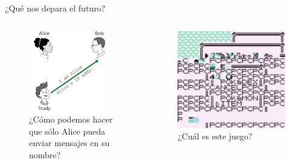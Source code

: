 \documentclass[10pt]{beamer} %
\begin{document}
\begin{frame}{¿Qué nos depara el futuro?}
\begin{columns}
\begin{column}{.5\linewidth}
    \begin{figure}[h]
	\includegraphics[width=\linewidth,]{trudy.png}
	\caption{¿Cómo podemos hacer que sólo Alice pueda enviar mensajes en su nombre?}
	\label{fig:RSA}
	\end{figure}
\end{column}
\begin{column}{.5\linewidth}
    \begin{figure}[h]
	\includegraphics[width=\linewidth,]{8F.png}
	\caption{¿Cuál es este juego?}
	\label{fig:ACE}
	\end{figure}
    
\end{column}
\end{columns}
\end{frame}
\end{document}
